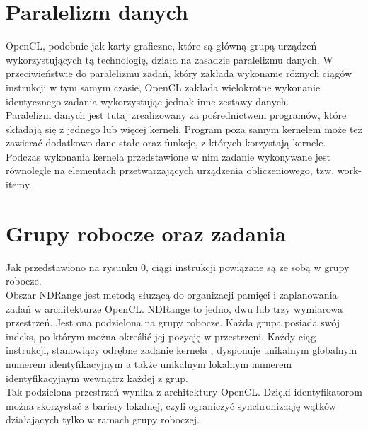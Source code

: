 \section{Paralelizm danych}
OpenCL, podobnie jak karty graficzne, które są główną grupą urządzeń wykorzystujących tą technologię, działa na zasadzie paralelizmu danych. W przeciwieństwie do paralelizmu zadań, który zakłada wykonanie różnych ciągów instrukcji w tym samym czasie, OpenCL zakłada wielokrotne wykonanie identycznego zadania wykorzystując jednak inne zestawy danych. \\
Paralelizm danych jest tutaj zrealizowany za pośrednictwem programów, które składają się z jednego lub więcej kerneli. Program poza samym kernelem może też zawierać dodatkowo dane stałe oraz funkcje, z których korzystają kernele. Podczas wykonania kernela przedstawione w nim zadanie wykonywane jest  równolegle na elementach przetwarzających urządzenia obliczeniowego, tzw. work-itemy. \\

\section{Grupy robocze oraz zadania}
Jak przedstawiono na rysunku 0, ciągi instrukcji powiązane są ze sobą w grupy robocze. \\
Obszar NDRange jest metodą słuzącą do organizacji pamięci i zaplanowania zadań w architekturze OpenCL. NDRange to jedno, dwu lub trzy wymiarowa przestrzeń. Jest ona podzielona na grupy robocze. Każda grupa posiada swój indeks, po którym można określić jej pozycję w przestrzeni. Każdy ciąg instrukcji, stanowiący odrębne zadanie kernela , dysponuje unikalnym globalnym numerem identyfikacyjnym a także unikalnym lokalnym numerem identyfikacyjnym wewnątrz każdej z grup.  \\
Tak podzielona przestrzeń wynika z architektury OpenCL. Dzięki identyfikatorom można skorzystać z bariery lokalnej, czyli ograniczyć synchronizację wątków działających tylko w ramach grupy roboczej.


